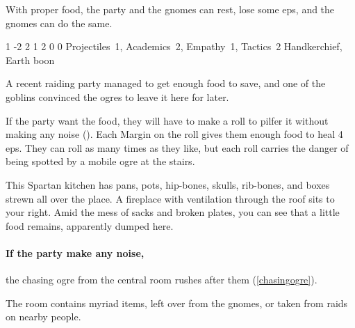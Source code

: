 \begin{multicols}{2}
With proper food, the party and the gnomes can rest, lose some \glspl{ep}, and the gnomes can do the same.




{1}%
{-2}%
{{2}%
{1}%
{2}}%
{0}%
{0}%
{Projectiles~1, Academics~2, Empathy~1, Tactics~2}%
{Handkerchief, Earth \gls{boon}}%
{
  \setcounter{Fate}{2}
  \setcounter{Water}{3}
  \setcounter{Earth}{1}
  \setcounter{fp}{3}
}

\secondRaidingParty


\begin{exampletext}
  A recent raiding party managed to get enough food to save, and one of the goblins convinced the ogres to leave it here for later.
\end{exampletext}

If the party want the food, they will have to make a  roll to pilfer it without making any noise (\tn[8]).
Each Margin on the roll gives them enough food to heal 4 \glspl{ep}.
They can roll as many times as they like, but each roll carries the danger of being spotted by a mobile ogre at the stairs.

\begin{boxtext}
  This Spartan kitchen has pans, pots, hip-bones, skulls, rib-bones, and boxes strewn all over the place.
  A fireplace with ventilation through the roof sits to your right.
  Amid the mess of sacks and broken plates, you can see that a little food remains, apparently dumped here.
\end{boxtext}

\paragraph{If the party make any noise,}
the chasing ogre from the central room rushes after them (\vref{chasingogre}).


The room contains myriad items, left over from the gnomes, or taken from raids on nearby people.

\columnbreak


\end{multicols}

